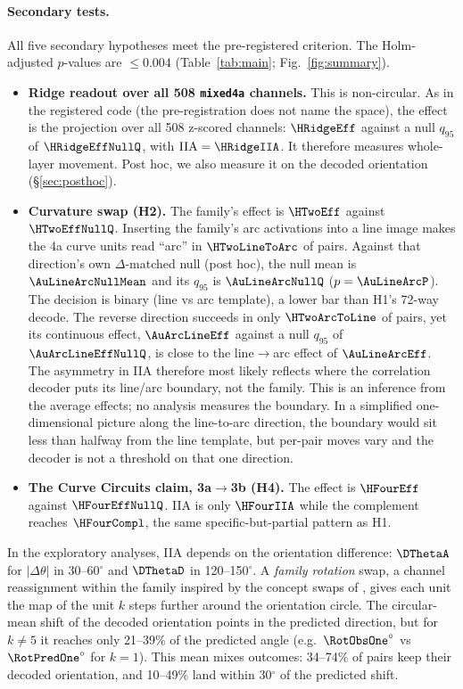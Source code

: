 \documentclass[11pt]{article}
\newcommand{\iia}{\mathrm{IIA}}
\begin{document}
\paragraph{Secondary tests.}
All five secondary hypotheses meet the pre-registered criterion. The Holm-adjusted $p$-values are $\le0.004$ (Table~\ref{tab:main}; Fig.~\ref{fig:summary}).
\begin{itemize}
\item \textbf{Ridge readout over all 508 \texttt{mixed4a} channels.} This is non-circular. As in the registered code (the pre-registration does not name the space), the effect is the projection over all 508 z-scored channels: $\HRidgeEff$ against a null $q_{95}$ of $\HRidgeEffNullQ$, with $\iia=\HRidgeIIA$. It therefore measures whole-layer movement. Post hoc, we also measure it on the decoded orientation (\S\ref{sec:posthoc}).
\item \textbf{Curvature swap (H2).} The family's effect is $\HTwoEff$ against $\HTwoEffNullQ$. Inserting the family's arc activations into a line image makes the 4a curve units read ``arc'' in $\HTwoLineToArc$ of pairs. Against that direction's own $\Delta$-matched null (post hoc), the null mean is $\AuLineArcNullMean$ and its $q_{95}$ is $\AuLineArcNullQ$ ($p=\AuLineArcP$). The decision is binary (line vs arc template), a lower bar than H1's 72-way decode. The reverse direction succeeds in only $\HTwoArcToLine$ of pairs, yet its continuous effect, $\AuArcLineEff$ against a null $q_{95}$ of $\AuArcLineEffNullQ$, is close to the line$\to$arc effect of $\AuLineArcEff$. The asymmetry in IIA therefore most likely reflects where the correlation decoder puts its line/arc boundary, not the family. This is an inference from the average effects; no analysis measures the boundary. In a simplified one-dimensional picture along the line-to-arc direction, the boundary would sit less than halfway from the line template, but per-pair moves vary and the decoder is not a threshold on that one direction.
\item \textbf{The Curve Circuits claim, 3a$\to$3b (H4).} The effect is $\HFourEff$ against $\HFourEffNullQ$. IIA is only $\HFourIIA$ while the complement reaches $\HFourCompl$, the same specific-but-partial pattern as H1.
\end{itemize}
In the exploratory analyses, IIA depends on the orientation difference: $\DThetaA$ for $|\Delta\theta|$ in 30--60$^\circ$ and $\DThetaD$ in 120--150$^\circ$. A \emph{family rotation} swap, a channel reassignment within the family inspired by the concept swaps of \citet{gurnee2026workspace}, gives each unit the map of the unit $k$ steps further around the orientation circle. The circular-mean shift of the decoded orientation points in the predicted direction, but for $k\neq5$ it reaches only 21--39\% of the predicted angle (e.g.\ $\RotObsOne^\circ$ vs $\RotPredOne^\circ$ for $k=1$). This mean mixes outcomes: 34--74\% of pairs keep their decoded orientation, and 10--49\% land within 30$^\circ$ of the predicted shift.
\end{document}
